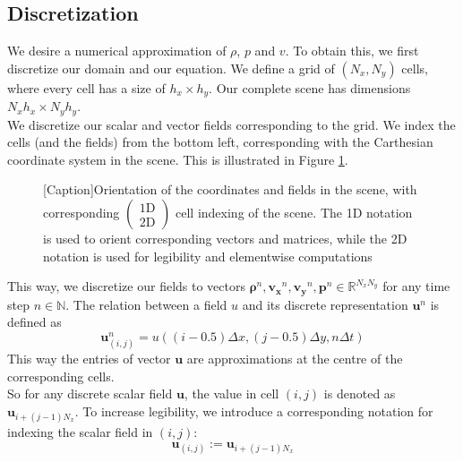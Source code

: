 \documentclass{article}
\renewcommand{\vec}[1]{\mathbf{#1}}
\newcommand{\gvec}[1]{\boldsymbol#1}
\begin{document}
\subsection{Discretization}
We desire a numerical approximation of $\rho$, $p$ and $v$. To obtain this, we first discretize our domain and our equation. We define a grid of $(N_x,N_y)$ cells, where every cell has a size of $h_x\times h_y$. Our complete scene has dimensions $N_xh_x\times N_yh_y$. 
\ \\
We discretize our scalar and vector fields corresponding to the grid. We index the cells (and the fields) from the bottom left, corresponding with the Carthesian coordinate system in the scene. This is illustrated in Figure \ref{fig:indexing}.
\begin{figure}
	\centering
	[Caption]{Orientation of the coordinates and fields in the scene, with corresponding $\left(\begin{matrix}\text{1D} \\ \text{2D} \end{matrix}\right)$ cell indexing of the scene. The 1D notation is used to orient corresponding vectors and matrices, while the 2D notation is used for legibility and elementwise computations}
	\label{fig:indexing}
\end{figure}
This way, we discretize our fields to vectors $\gvec{\rho}^n,\vec{v_x}^n,\vec{v_y}^n, \vec{p}^n\in\mathbb{R}^{N_xN_y}$ for any time step $n\in\mathbb{N}$. The relation between a field $u$ and its discrete representation $\vec{u}^n$ is defined as
$$\vec{u}^n_{(i,j)} = u((i-0.5)\Delta x,(j-0.5)\Delta y,n\Delta t)$$
This way the entries of vector $\vec{u}$ are approximations at the centre of the corresponding cells.
\ \\
So for any discrete scalar field $\vec{u}$, the value in cell $(i,j)$ is denoted as $\vec{u}_{i+(j-1)N_x}$. To increase legibility, we introduce a corresponding notation for indexing the scalar field in $(i,j)$:
\begin{equation}
	\vec{u}_{(i,j)}:=\vec{u}_{i+(j-1)N_x}
\end{equation}
\end{document}
